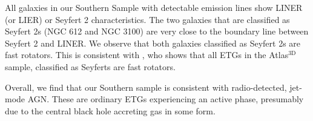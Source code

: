 	All galaxies in our Southern Sample with detectable emission lines show LINER (or LIER) or Seyfert 2 characteristics. The two galaxies that are classified as Seyfert 2s (NGC 612 and NGC 3100) are very close to the boundary line between Seyfert 2 and LINER. We observe that both galaxies classified as Seyfert 2s are fast rotators. This is consistent with \citet{Nyland2016}, who shows that all ETGs in the Atlas$^\text{3D}$ sample, classified as Seyferts are fast rotators. 

	Overall, we find that our Southern sample is consistent with radio-detected, jet-mode AGN. These are ordinary ETGs experiencing an active phase, presumably due to the central black hole accreting gas in some form. 
